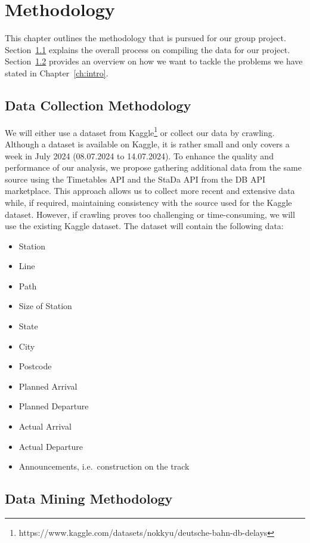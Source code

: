 \documentclass[a4paper,oneside,bibliography=totoc]{scrbook}
\begin{document}
\chapter{Methodology}
\label{ch:methodology}
This chapter outlines the methodology that is pursued for our group project.
Section~\ref{sec:dataset} explains the overall process on compiling the data for our project.
Section~\ref{sec:data-mining-methodology} provides an overview
on how we want to tackle the problems we have stated in Chapter~\ref{ch:intro}.

\section{Data Collection Methodology}
\label{sec:dataset}

We will either use a dataset from Kaggle\footnote{https://www.kaggle.com/datasets/nokkyu/deutsche-bahn-db-delays}
or collect our data by crawling.
Although a dataset is available on Kaggle, it is rather small and only covers a week in July 2024
(08.07.2024 to 14.07.2024).
To enhance the quality and performance of our analysis,
we propose
gathering additional data from the same source using the Timetables API and the StaDa API from the DB API marketplace.
This approach allows us to collect more recent and extensive data while, if required,
maintaining consistency with the source used for the Kaggle dataset.
However, if crawling proves too challenging or time-consuming, we will use the existing Kaggle dataset.
The dataset will contain the following data:

\begin{itemize}
    \item Station
    \item Line
    \item Path
    \item Size of Station
    \item State
    \item City
    \item Postcode
    \item Planned Arrival
    \item Planned Departure
    \item Actual Arrival
    \item Actual Departure
    \item Announcements, i.e.\ construction on the track
\end{itemize}


\section{Data Mining Methodology}
\label{sec:data-mining-methodology}
\end{document}
